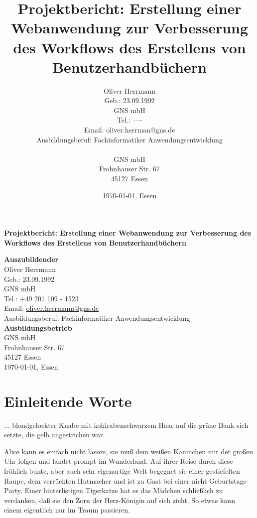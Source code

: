 \documentclass[12pt]{scrartcl}
\title{
	Projektbericht: Erstellung einer Webanwendung
	zur Verbesserung des Workflows des Erstellens von Benutzerhandbüchern
}
\author{
	Oliver Herrmann \\
	Geb.: 23.09.1992 \\
	GNS mbH \\
	Tel.: ---- \\
	Email: oliver.herrman@gns.de \\
	Ausbildungsberuf: Fachinformatiker Anwendungsentwicklung \\
	\\
	GNS mbH \\
	Frohnhauser Str. 67 \\
	45127 Essen
}
\date{\today, Essen}
\begin{document}
\thispagestyle{empty}

\begin{center}
	\huge \bfseries
		Projektbericht: Erstellung einer Webanwendung
		zur Verbesserung des Workflows des Erstellens von Benutzerhandbüchern \\[4cm]

	\Large	\mdseries

	\textbf{Auszubildender} \\
	Oliver Herrmann \\
	Geb.: 23.09.1992 \\
	GNS mbH \\
	Tel.: +49 201 109 - 1523 \\
	Email: \href{mailto:oliver.herrmann@gns.de}{oliver.herrmann@gns.de}  \\
	Ausbildungsberuf: Fachinformatiker Anwendungsentwicklung \\[2cm]

	\textbf{Ausbildungsbetrieb} \\
	GNS mbH \\
	Frohnhauser Str. 67 \\
	45127 Essen \\[3cm]

	\today, Essen
\end{center}


\newpage

\tableofcontents
\newpage



\section{Einleitende Worte}
\label{sec:einleitende-worte}
...
blondgelockter Knabe mit kohlrabenschwarzem Haar auf die grüne Bank
sich setzte, die gelb angestrichen war.


Alice kann es einfach nicht lassen, sie muß dem weißen Kaninchen mit
der großen Uhr folgen und landet prompt im Wunderland. Auf ihrer Reise
durch diese fröhlich bunte, aber auch sehr eigenartige Welt begegnet
sie einer gestiefelten Raupe, dem verrückten Hutmacher und ist zu Gast
bei einer nicht Geburtstags-Party. Einer hinterlistigen Tigerkatze hat
es das Mädchen schließlich zu verdanken, daß sie den Zorn der
Herz-Königin auf sich zieht. So etwas kann einem eigentlich nur im
Traum passieren.
\end{document}
